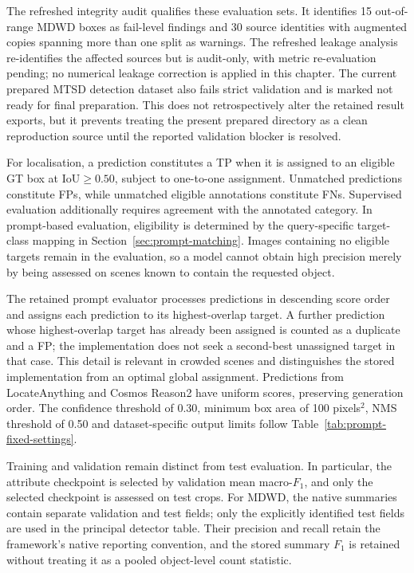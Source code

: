 The refreshed integrity audit qualifies these evaluation sets. It identifies 15 out-of-range \gls{MDWD} boxes as fail-level findings and 30 source identities with augmented copies spanning more than one split as warnings. The refreshed leakage analysis re-identifies the affected sources but is audit-only, with metric re-evaluation pending; no numerical leakage correction is applied in this chapter. The current prepared \gls{MTSD} detection dataset also fails strict validation and is marked not ready for final preparation. This does not retrospectively alter the retained result exports, but it prevents treating the present prepared directory as a clean reproduction source until the reported validation blocker is resolved.

For localisation, a prediction constitutes a \gls{TP} when it is assigned to an eligible \gls{GT} box at \(\mathrm{IoU}\geq0.50\), subject to one-to-one assignment. Unmatched predictions constitute \glspl{FP}, while unmatched eligible annotations constitute \glspl{FN}. Supervised evaluation additionally requires agreement with the annotated category. In prompt-based evaluation, eligibility is determined by the query-specific target-class mapping in Section~\ref{sec:prompt-matching}. Images containing no eligible targets remain in the evaluation, so a model cannot obtain high precision merely by being assessed on scenes known to contain the requested object.

The retained prompt evaluator processes predictions in descending score order and assigns each prediction to its highest-overlap target. A further prediction whose highest-overlap target has already been assigned is counted as a duplicate and a \gls{FP}; the implementation does not seek a second-best unassigned target in that case. This detail is relevant in crowded scenes and distinguishes the stored implementation from an optimal global assignment. Predictions from LocateAnything and Cosmos Reason2 have uniform scores, preserving generation order. The confidence threshold of 0.30, minimum box area of 100 pixels$^2$, \gls{NMS} threshold of 0.50 and dataset-specific output limits follow Table~\ref{tab:prompt-fixed-settings}.

Training and validation remain distinct from test evaluation. In particular, the attribute checkpoint is selected by validation mean macro-\(F_1\), and only the selected checkpoint is assessed on test crops. For \gls{MDWD}, the native summaries contain separate validation and test fields; only the explicitly identified test fields are used in the principal detector table. Their precision and recall retain the framework's native reporting convention, and the stored summary \(F_1\) is retained without treating it as a pooled object-level count statistic.

